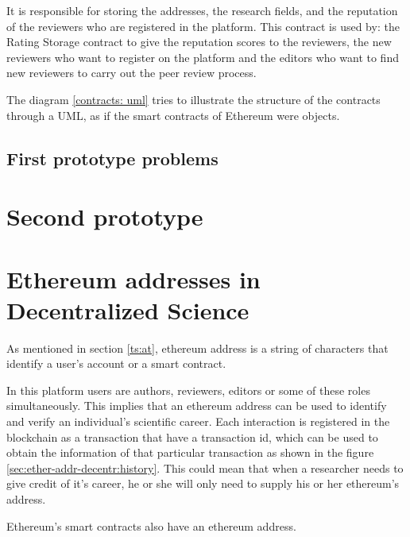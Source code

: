 It is responsible for storing the addresses, the research fields, and the
reputation of the reviewers who are registered in the platform. This contract is
used by: the Rating Storage contract to give the reputation scores to the
reviewers, the new reviewers who want to register on the platform and the
editors who want to find new reviewers to carry out the peer review process.

The diagram \ref{contracts: uml} tries to illustrate the structure of the
contracts through a UML, as if the smart contracts of Ethereum were objects.

\subsection*{First prototype problems}
\label{sec:first-prot-probl}

\section{Second prototype}


\section{Ethereum addresses in Decentralized Science}
\label{sec:ether-addr-decentr}


As mentioned in section \ref{ts:at}, ethereum address is a string of characters
that identify a user's account or a smart contract.

In this platform users are authors, reviewers, editors or some of these roles
simultaneously. This implies that an ethereum address can be used to identify
and verify an individual's scientific career. Each interaction is registered in
the blockchain as a transaction that have a transaction id, which can be used to
obtain the information of that particular transaction as shown in the figure
\ref{sec:ether-addr-decentr:history}. This could mean that when a researcher
needs to give credit of it's career, he or she will only need to supply his or
her ethereum's address.


Ethereum's smart contracts also have an ethereum address.

